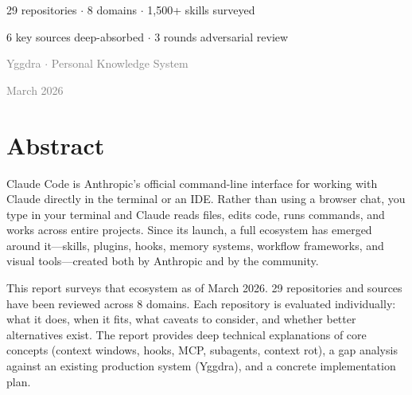 \documentclass[11pt,a4paper]{article}
\begin{document}
\begin{center}

\vspace{1.5cm}

{\large 29 repositories $\cdot$ 8 domains $\cdot$ 1,500+ skills surveyed}

\vspace{0.3cm}

{\normalsize 6 key sources deep-absorbed $\cdot$ 3 rounds adversarial review}

\vspace{2cm}

\textcolor{gray}{\small Yggdra $\cdot$ Personal Knowledge System}

\textcolor{gray}{\small March 2026}

\end{center}
\newpage

\tableofcontents
\newpage

\section{Abstract}

Claude Code is Anthropic's official command-line interface for working with Claude directly in the terminal or an IDE. Rather than using a browser chat, you type in your terminal and Claude reads files, edits code, runs commands, and works across entire projects. Since its launch, a full ecosystem has emerged around it---skills, plugins, hooks, memory systems, workflow frameworks, and visual tools---created both by Anthropic and by the community.

This report surveys that ecosystem as of March 2026. 29 repositories and sources have been reviewed across 8 domains. Each repository is evaluated individually: what it does, when it fits, what caveats to consider, and whether better alternatives exist. The report provides deep technical explanations of core concepts (context windows, hooks, MCP, subagents, context rot), a gap analysis against an existing production system (Yggdra), and a concrete implementation plan.
\end{document}
